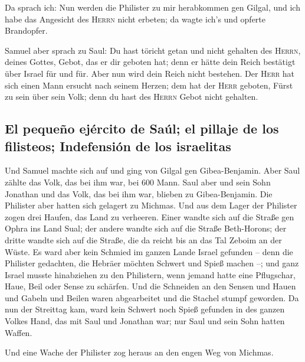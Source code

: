  Da sprach ich: Nun werden die Philister zu mir
herabkommen gen Gilgal, und ich habe das Angesicht des \textsc{Herrn}
nicht erbeten; da wagte ich's und opferte Brandopfer.

 Samuel aber sprach zu Saul: Du hast töricht getan und
nicht gehalten des \textsc{Herrn}, deines Gottes, Gebot, das er dir
geboten hat; denn er hätte dein Reich bestätigt über Israel für und für.
 Aber nun wird dein Reich nicht bestehen. Der
\textsc{Herr} hat sich einen Mann ersucht nach seinem Herzen; dem hat
der \textsc{Herr} geboten, Fürst zu sein über sein Volk; denn du hast
des \textsc{Herrn} Gebot nicht gehalten.

\hypertarget{el-pequeuxf1o-ejuxe9rcito-de-sauxfal-el-pillaje-de-los-filisteos-indefensiuxf3n-de-los-israelitas}{%
\subsection{El pequeño ejército de Saúl; el pillaje de los filisteos;
Indefensión de los
israelitas}\label{el-pequeuxf1o-ejuxe9rcito-de-sauxfal-el-pillaje-de-los-filisteos-indefensiuxf3n-de-los-israelitas}}

 Und Samuel machte sich auf und ging von Gilgal gen
Gibea-Benjamin. Aber Saul zählte das Volk, das bei ihm war, bei 600
Mann.  Saul aber und sein Sohn Jonathan und das Volk, das
bei ihm war, blieben zu Gibea-Benjamin. Die Philister aber hatten sich
gelagert zu Michmas.  Und aus dem Lager der Philister
zogen drei Haufen, das Land zu verheeren. Einer wandte sich auf die
Straße gen Ophra ins Land Sual;  der andere wandte sich
auf die Straße Beth-Horons; der dritte wandte sich auf die Straße, die
da reicht bis an das Tal Zeboim an der Wüste.  Es ward
aber kein Schmied im ganzen Lande Israel gefunden -- denn die Philister
gedachten, die Hebräer möchten Schwert und Spieß machen --;
 und ganz Israel musste hinabziehen zu den Philistern,
wenn jemand hatte eine Pflugschar, Haue, Beil oder Sense zu schärfen.
 Und die Schneiden an den Sensen und Hauen und Gabeln und
Beilen waren abgearbeitet und die Stachel stumpf geworden.
 Da nun der Streittag kam, ward kein Schwert noch Spieß
gefunden in des ganzen Volkes Hand, das mit Saul und Jonathan war; nur
Saul und sein Sohn hatten Waffen.

 Und eine Wache der Philister zog heraus an den engen Weg
von Michmas.

